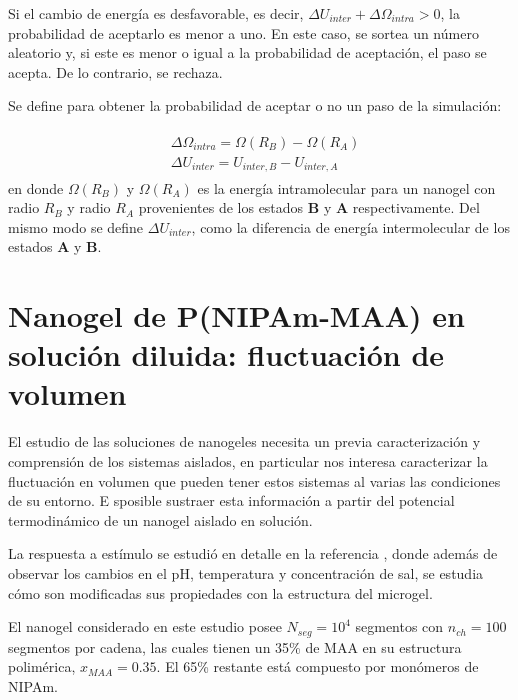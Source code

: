 	
	Si el cambio de energ\'ia es desfavorable, es decir, $\Delta U_{inter} + \Delta \Omega_{intra} > 0$, la probabilidad de aceptarlo es menor a uno. En este caso, se sortea un n\'umero aleatorio y, si este es menor o igual a la probabilidad de aceptaci\'on, el paso se acepta. De lo contrario, se rechaza. 
	
	Se define para obtener la probabilidad de aceptar o no un paso de la simulaci\'on:
	
	\begin{align}
		\begin{aligned}
			& \Delta \Omega_{intra} = \Omega(R_B) - \Omega(R_A) \\
			& \Delta U_{inter} = U_{inter,B} - U_{inter,A}
		\end{aligned}
	\end{align}
	\noindent en donde $\Omega(R_B)$ y $\Omega(R_A)$ es la energ\'ia intramolecular para un nanogel con radio $R_B$ y radio $R_A$ provenientes de los estados \textbf{B} y \textbf{A} respectivamente. Del mismo modo se define $\Delta U_{inter}$, como la diferencia de energ\'ia intermolecular de los estados \textbf{A} y \textbf{B}.
	

	
	\section{Nanogel de P(NIPAm-MAA) en soluci\'on diluida: fluctuaci\'on de volumen} \label{sec:fluctuacion-volumen}
	
	El estudio de las soluciones de nanogeles necesita un previa caracterizaci\'on y comprensi\'on de los sistemas aislados, en particular nos interesa caracterizar la fluctuaci\'on en volumen que pueden tener estos sistemas al varias las condiciones de su entorno.  E sposible sustraer esta informaci\'on a partir del potencial termodin\'amico de un nanogel aislado en soluci\'on.
	
	La respuesta a est\'imulo se estudi\'o en detalle en la referencia \cite{perez2021thermodynamic}, donde adem\'as de observar los cambios en el pH, temperatura y concentraci\'on de sal, se estudia c\'omo son modificadas sus propiedades con la estructura del microgel.
	
	El nanogel considerado en este estudio posee $N_{seg} = 10^4$ segmentos con $n_{ch} = 100$ segmentos por cadena, las cuales tienen un 35\% de MAA en su estructura polim\'erica, $x_{MAA} = 0.35$. El 65\% restante est\'a compuesto por mon\'omeros de NIPAm.
	
